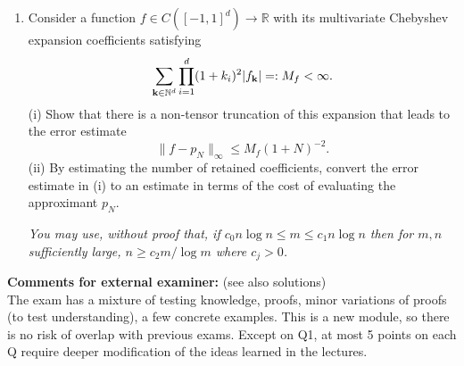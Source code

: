 \documentclass{exams}
\newcommand{\R}{\mathbb{R}}
\newcommand{\N}{\mathbb{N}}
\begin{document}
\begin{examcomp1}
\begin{question}
\begin{enumerate}
  (ii) Estimate the computational cost of evaluating $p({\bf x})$ at a single
  point ${\bf x}  \in \R^d$.

  (iii) Suppose that for all $i = 1, \dots, d$, $x_i \mapsto f({\bf x})$ is analytic in $E(\rho)$ (with $x_j, j \neq i$
  remaining fixed) where $E(\rho)$ is the usual Bernstein ellipse. Prove the following tensor product polynomial
  approximation in the max-norm, defining what we mean by $\tilde{\Pi}_N^{(i)}$,
   \[ 
      \|f - \tilde\Pi_N^{(d)} \cdots \tilde\Pi_N^{(1)} f \|_\infty 
      \leq C (\log N)^d \rho^{-N}.
   \]
  {\it You may use \eqref{eq:approxcheb} without proof, as well as 
  the bound $\| \tilde\Pi_N g \|_\infty 
  \leq C \log N \|g\|_\infty$ for $g \in C([-1,1])$. Compare with (Q1c.)}
  
  (iv)  Convert the result from (iii) into an estimate in terms of the cost
  of storing and evaluating the multivariate polynomial, and thus explain the
  term ``curse of dimensionality''. 
  
  \item Consider a function $f \in C([-1,1]^d) \to \R$ with its multivariate 
  Chebyshev expansion coefficients satisfying 
  \[
      \sum_{{\bf k} \in \N^d} \prod_{i=1}^d (1+k_i)^2 |f_{\bf k}| =: M_f < \infty.
  \]
  (i) Show that there is a non-tensor truncation of this expansion
  that leads to the error estimate  
  \[
      \| f - p_N \|_\infty \leq M_f (1+N)^{-2}.
  \]
   (ii) By estimating the number of retained coefficients, convert the error 
   estimate in (i) to an estimate in terms of the cost of evaluating the 
   approximant $p_N$. 
   
  {\it You may use, without proof that, if $c_0 n \log n \leq m \leq c_1 n \log n$ then 
  for $m, n$ sufficiently large, 
  $n \geq c_2 m /
  \log m$ where $c_j > 0$. }

  \end{enumerate}
\end{question}


%
\end{examcomp1}

\clearpage 

{\bf Comments for external examiner: } (see also solutions) \\ The exam has a
mixture of testing knowledge, proofs, minor variations of proofs (to test
understanding), a few concrete examples. This is a new module, so there is no
risk of overlap with previous exams. Except on Q1, at most 5 points on each Q
require deeper modification of the ideas learned in the lectures.
\end{document}
